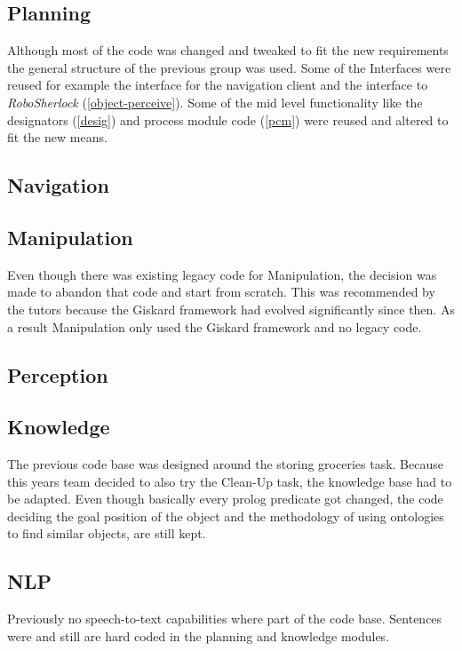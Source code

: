\documentclass[main.tex]{subfiles}
\begin{document}
	\subsection{Planning}
		Although most of the code was changed and tweaked to fit the new requirements the general structure of the previous group was used. Some of the Interfaces were reused for example the interface for the navigation client and the interface to \textit{RoboSherlock} (\ref{object-perceive}). Some of the mid level functionality like the designators (\ref{desig}) and process module code (\ref{pcm}) were reused and altered to fit the new means.
	\subsection{Navigation}
	\subsection{Manipulation}
		Even though there was existing legacy code for Manipulation, the decision was made to abandon that code and start from scratch. This was recommended by the tutors because the Giskard framework had evolved significantly since then. As a result Manipulation only used the Giskard framework and no legacy code.
	\subsection{Perception}
	\subsection{Knowledge}
        The previous code base was designed around the storing groceries task. Because this years team decided to also try the Clean-Up task, the knowledge base had to be adapted. Even though basically every prolog predicate got changed, the code deciding the goal position of the object and the methodology of using ontologies to find similar objects, are still kept.
    \subsection{NLP}
        Previously no speech-to-text capabilities where part of the code base. Sentences were and still are hard coded in the planning and knowledge modules.
\end{document}
